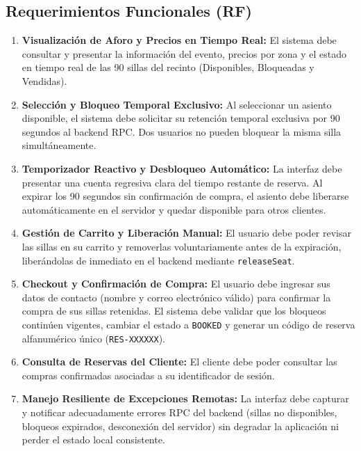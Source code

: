 \documentclass[10pt,letterpaper]{article}
\begin{document}
\subsection{Requerimientos Funcionales (RF)}
\begin{enumerate}[label=\textbf{RF-\arabic*:}, leftmargin=*]
  \item \textbf{Visualización de Aforo y Precios en Tiempo Real:} El sistema debe consultar y presentar la información del evento, precios por zona y el estado en tiempo real de las 90 sillas del recinto (Disponibles, Bloqueadas y Vendidas).
  \item \textbf{Selección y Bloqueo Temporal Exclusivo:} Al seleccionar un asiento disponible, el sistema debe solicitar su retención temporal exclusiva por 90 segundos al backend RPC. Dos usuarios no pueden bloquear la misma silla simultáneamente.
  \item \textbf{Temporizador Reactivo y Desbloqueo Automático:} La interfaz debe presentar una cuenta regresiva clara del tiempo restante de reserva. Al expirar los 90 segundos sin confirmación de compra, el asiento debe liberarse automáticamente en el servidor y quedar disponible para otros clientes.
  \item \textbf{Gestión de Carrito y Liberación Manual:} El usuario debe poder revisar las sillas en su carrito y removerlas voluntariamente antes de la expiración, liberándolas de inmediato en el backend mediante \texttt{releaseSeat}.
  \item \textbf{Checkout y Confirmación de Compra:} El usuario debe ingresar sus datos de contacto (nombre y correo electrónico válido) para confirmar la compra de sus sillas retenidas. El sistema debe validar que los bloqueos continúen vigentes, cambiar el estado a \texttt{BOOKED} y generar un código de reserva alfanumérico único (\texttt{RES-XXXXXX}).
  \item \textbf{Consulta de Reservas del Cliente:} El cliente debe poder consultar las compras confirmadas asociadas a su identificador de sesión.
  \item \textbf{Manejo Resiliente de Excepciones Remotas:} La interfaz debe capturar y notificar adecuadamente errores RPC del backend (sillas no disponibles, bloqueos expirados, desconexión del servidor) sin degradar la aplicación ni perder el estado local consistente.
\end{enumerate}
\end{document}
